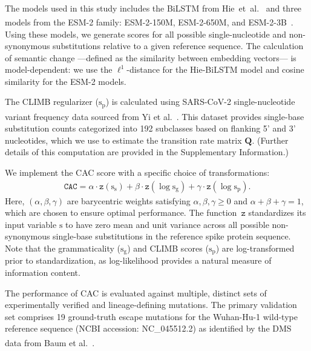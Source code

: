 \documentclass[pdflatex,sn-nature]{sn-jnl}
\renewcommand\cite[1]{\unskip\textsuperscript{\citep{#1}}}
\begin{document}
The models used in this study includes the BiLSTM from Hie~et~al.~\cite{hie2021learning} and three models from the ESM-2 family: ESM-2-150M, ESM-2-650M, and ESM-2-3B~\cite{lin2023evolutionary}.
%
Using these models, we generate scores for all possible single-nucleotide and non-synonymous substitutions relative to a given reference sequence.
The calculation of semantic change ---defined as the similarity between embedding vectors--- is model-dependent: we use the $\ell^1$-distance for the Hie-BiLSTM model and cosine similarity for the ESM-2 models.

The CLIMB regularizer ($\mathrm{s}_\text{p}$) is calculated using SARS-CoV-2 single-nucleotide variant frequency data sourced from Yi et al.~\cite{yi2021mutational}.
This dataset provides single-base substitution counts categorized into 192 subclasses based on flanking 5' and 3' nucleotides, which we use to estimate the transition rate matrix $\mathbf{Q}$.
(Further details of this computation are provided in the Supplementary Information.)

We implement the CAC score with a specific choice of transformations:
\begin{align}
    \mathtt{CAC}
    = \alpha \cdot \mathtt{z}(\mathrm{s}_\text{s})
    + \beta \cdot \mathtt{z}(\log \mathrm{s}_\text{g})
    + \gamma \cdot \mathtt{z}(\log \mathrm{s}_\text{p}).
    \label{e:cscs_reg_impl}
\end{align}
%
Here, $(\alpha, \beta, \gamma)$ are barycentric weights satisfying $\alpha, \beta, \gamma \geq 0$ and $\alpha + \beta + \gamma = 1$, which are chosen to ensure optimal performance.
The function~$\mathtt{z}$ standardizes its input variable $\mathrm{s}$ to have zero mean and unit variance across all possible non-synonymous single-base substitutions in the reference spike protein sequence.
%
Note that the grammaticality ($\mathrm{s}_\text{g}$) and CLIMB scores ($\mathrm{s}_\text{p}$) are log-transformed prior to standardization, as log-likelihood provides a natural measure of information content.

The performance of CAC is evaluated against multiple, distinct sets of experimentally verified and lineage-defining mutations.
The primary validation set comprises 19 ground-truth escape mutations for the Wuhan-Hu-1 wild-type reference sequence (NCBI accession: NC\_045512.2) as identified by the DMS data from Baum et al.~\cite{baum2020antibody}.
\end{document}
